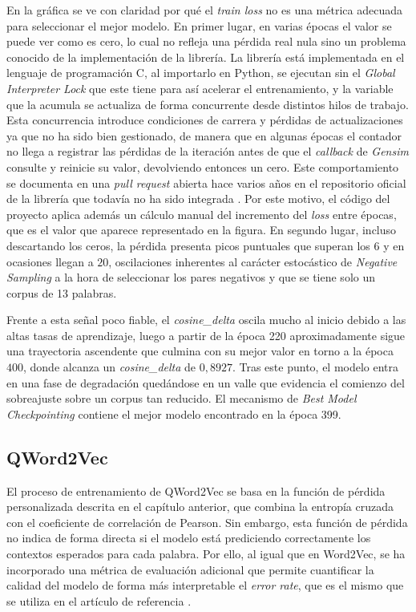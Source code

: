 En la gráfica se ve con claridad por qué el \textit{train loss} no es una métrica adecuada para seleccionar el mejor modelo. En primer lugar, en varias épocas el valor se puede ver como es cero, lo cual no refleja una pérdida real nula sino un problema conocido de la implementación de la librería. La librería está implementada en el lenguaje de programación C, al importarlo en Python, se ejecutan sin el \textit{Global Interpreter Lock} que este tiene para así acelerar el entrenamiento, y la variable que la acumula se actualiza de forma concurrente desde distintos hilos de trabajo. Esta concurrencia introduce condiciones de carrera y pérdidas de actualizaciones ya que no ha sido bien gestionado, de manera que en algunas épocas el contador no llega a registrar las pérdidas de la iteración antes de que el \textit{callback} de \textit{Gensim} consulte y reinicie su valor, devolviendo entonces un cero. Este comportamiento se documenta en una \textit{pull request} abierta hace varios años en el repositorio oficial de la librería que todavía no ha sido integrada \cite{alreadytaikeune_gensim_loss_2018}. Por este motivo, el código del proyecto aplica además un cálculo manual del incremento del \textit{loss} entre épocas, que es el valor que aparece representado en la figura. En segundo lugar, incluso descartando los ceros, la pérdida presenta picos puntuales que superan los $6$ y en ocasiones llegan a $20$, oscilaciones inherentes al carácter estocástico de \textit{Negative Sampling} a la hora de seleccionar los pares negativos y que se tiene solo un corpus de 13 palabras.

Frente a esta señal poco fiable, el \textit{cosine\_delta} oscila mucho al inicio debido a las altas tasas de aprendizaje, luego a partir de la época 220 aproximadamente sigue una trayectoria ascendente que culmina con su mejor valor en torno a la época $400$, donde alcanza un \textit{cosine\_delta} de $0{,}8927$. Tras este punto, el modelo entra en una fase de degradación quedándose en un valle que evidencia el comienzo del sobreajuste sobre un corpus tan reducido. El mecanismo de \textit{Best Model Checkpointing} contiene el mejor modelo encontrado en la época 399.


\subsection{QWord2Vec}

El proceso de entrenamiento de QWord2Vec se basa en la función de pérdida personalizada descrita en el capítulo anterior, que combina la entropía cruzada con el coeficiente de correlación de Pearson. Sin embargo, esta función de pérdida no indica de forma directa si el modelo está prediciendo correctamente los contextos esperados para cada palabra. Por ello, al igual que en Word2Vec, se ha incorporado una métrica de evaluación adicional que permite cuantificar la calidad del modelo de forma más interpretable el \textit{error rate}, que es el mismo que se utiliza en el artículo de referencia \cite{ohno_qword2vec_2025}.

